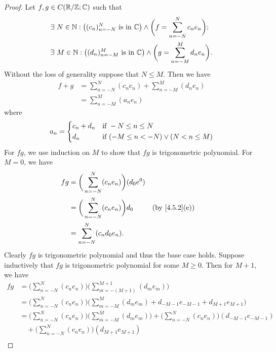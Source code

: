\begin{proof}
  Let \(f, g \in C(\mathbb{R} / \mathbb{Z} ; \mathbb{C})\) such that
  \begin{align*}
     & \exists\ N \in \mathbb{N} : \big((c_n)_{n = -N}^N \text{ is in } \mathbb{C}\big) \land \bigg(f = \sum_{n = -N}^N c_n e_n\bigg); \\
     & \exists\ M \in \mathbb{N} : \big((d_n)_{n = -M}^M \text{ is in } \mathbb{C}\big) \land \bigg(g = \sum_{n = -M}^M d_n e_n\bigg).
  \end{align*}
  Without the loss of generality suppose that \(N \leq M\).
  Then we have
  \begin{align*}
    f + g & = \sum_{n = -N}^N (c_n e_n) + \sum_{n = -M}^M (d_n e_n) \\
          & = \sum_{n = -M}^M (a_n e_n)
  \end{align*}
  where
  \[
    a_n = \begin{dcases}
      c_n + d_n & \text{if } -N \leq n \leq N                     \\
      d_n       & \text{if } (-M \leq n < -N) \lor (N < n \leq M)
    \end{dcases}
  \]
  For \(fg\), we use induction on \(M\) to show that \(fg\) is trigonometric polynomial.
  For \(M = 0\), we have
  \begin{align*}
    fg & = \bigg(\sum_{n = -N}^N (c_n e_n)\bigg) (d_0 e^0)                                  \\
       & = \bigg(\sum_{n = -N}^N (c_n e_n)\bigg) d_0       &  & \text{(by \cref{4.5.2}(e))} \\
       & = \sum_{n = -N}^N (c_n d_0 e_n).
  \end{align*}
  Clearly \(fg\) is trigonometric polynomial and thus the base case holds.
  Suppose inductively that \(fg\) is trigonometric polynomial for some \(M \geq 0\).
  Then for \(M + 1\), we have
  \begin{align*}
    f g & = \bigg(\sum_{n = -N}^N (c_n e_n)\bigg) \bigg(\sum_{m = -(M + 1)}^{M + 1} (d_m e_m)\bigg)                                                        \\
        & = \bigg(\sum_{n = -N}^N (c_n e_n)\bigg) \bigg(\sum_{m = -M}^M (d_m e_m) + d_{-M - 1} e_{-M - 1} + d_{M + 1} e_{M + 1}\bigg)                      \\
        & = \bigg(\sum_{n = -N}^N (c_n e_n)\bigg) \bigg(\sum_{m = -M}^M (d_m e_m)\bigg) + \bigg(\sum_{n = -N}^N (c_n e_n)\bigg) (d_{-M - 1} e_{-M - 1})    \\
        & \quad + \bigg(\sum_{n = -N}^N (c_n e_n)\bigg) (d_{M + 1} e_{M + 1})                                                                              \\

\end{align*}
\end{proof}
